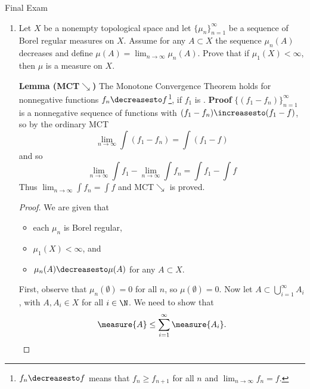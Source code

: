 \documentclass[12pt,letterpaper]{article}
\begin{document}
\pagestyle{fancy}
\begin{center}
{{\LARGE Final Exam}}%
\end{center}

\pagebreak
\begin{enumerate}
\item Let $X$ be a nonempty topological space and let $\{\mu_n\}_{n=1}^\infty$ be a sequence of Borel regular measures on $X$. Assume for any $A \subset X$ the sequence $\mu_n(A)$ decreases and define
$\mu(A) = \lim_{n\to\infty} \mu_n(A)$. Prove that if $\mu_1(X) < \infty$, then $\mu$ is a measure on $X$. 

\textbf{Lemma (MCT$\mathbf{\searrow}$)} The Monotone Convergence Theorem holds for nonnegative \mumeasurable{} functions $f_n\decreasesto f$\footnote{$f_n\decreasesto f$ means that $f_n\geq f_{n+1}$ for all $n$ and $\lim_{n\to\infty}f_n=f$.}, if $f_1$ is \musummable{}. \textbf{Proof}  $\{(f_1-f_n)\}_{n=1}^\infty$ is a nonnegative sequence of functions with $(f_1-f_n)\increasesto(f_1-f)$, so by the ordinary MCT
$$\lim_{n\to\infty}\int(f_1-f_n)=\int(f_1-f)$$
and so 
$$\lim_{n\to\infty}\int f_1-\lim_{n\to\infty}\int f_n=\int f_1-\int f$$ 
Thus $\lim_{n\to\infty}\int f_n = \int f$ and MCT$\searrow$ is proved. \qedwhite

\begin{proof}
We are given that 
	\begin{itemize}
	\item each $\mu_n$ is Borel regular,
	\item $\mu_1(X)<\infty$, and %
	\item $\mu_n(A)\decreasesto\mu(A)$ for any $A\subset X$.
	\end{itemize}

First, observe that $\mu_n(\emptyset)=0$ for all $n$, so $\mu(\emptyset)=0$. Now let $A\subset\bigcup_{i=1}^\infty A_i$, with $A,A_i\in X$ for all $i\in\N$. We need to show that 
$$\measure{A}\leq\sum_{i=1}^\infty\measure{A_i}.$$


\end{proof}
\end{enumerate}
\end{document}
